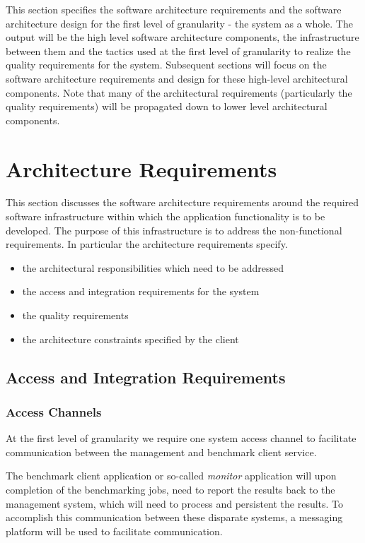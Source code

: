 This section specifies the software architecture requirements and the software architecture design
for the first level of granularity - the system as a whole. The output will be the high level software
architecture components, the infrastructure between them and the tactics used at the first level of
granularity to realize the quality requirements for the system.
Subsequent sections will focus on the software architecture requirements and design for these
high-level architectural components. Note that many of the architectural requirements (particularly
the quality requirements) will be propagated down to lower level architectural components.

\section{Architecture Requirements}
This section discusses the software architecture requirements around the 
required software infrastructure within which the application functionality is
to be developed. The purpose of this infrastructure is to address the
non-functional requirements. In particular the architecture requirements
specify.
\begin{itemize}
	\item the architectural responsibilities which need to be addressed
	\item the access and integration requirements for the system
	\item the quality requirements
	\item the architecture constraints specified by the client
\end{itemize}
\subsection{Access and Integration Requirements}
\subsubsection*{Access Channels}
At the first level of granularity we require one system access channel to
facilitate communication between the management and benchmark client service.

The benchmark client application or so-called \textit{monitor} application will upon
completion of the benchmarking jobs, need to report the results back to the
management system, which will need to process and persistent the results.
To accomplish this communication between these disparate systems, a messaging
platform will be used to facilitate communication.


